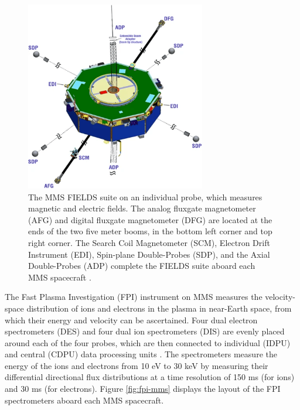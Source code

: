 \begin{figure}
    \centering
    \includegraphics[width=0.7\textwidth]{Figures/Instrumentation/Torbert_Figure7.png}
    \caption[MMS FIELDS suite]{The MMS FIELDS suite on an individual probe, which measures magnetic and electric fields. The analog fluxgate magnetometer (AFG) and digital fluxgate magnetometer (DFG) are located at the ends of the two five meter booms, in the bottom left corner and top right corner. The Search Coil Magnetometer (SCM),  Electron Drift Instrument (EDI), Spin-plane Double-Probes (SDP), and the Axial Double-Probes (ADP) complete the FIELDS suite aboard each MMS spacecraft \citep{Burch:2024}.}
    \label{fig:fgm-mms}
\end{figure}

The Fast Plasma Investigation (FPI) \citep{Pollock:2016} instrument on MMS measures the velocity-space distribution of ions and electrons in the plasma in near-Earth space, from which their energy and velocity can be ascertained. Four dual electron spectrometers (DES) and four dual ion spectrometers (DIS) are evenly placed around each of the four probes, which are then connected to individual (IDPU) and central (CDPU) data processing units \citep{Pollock:2016}. The spectrometers measure the energy of the ions and electrons from 10 eV to 30 keV by measuring their differential directional flux distributions at a time resolution of 150 ms (for ions) and 30 ms (for electrons). Figure \ref{fig:fpi-mms} displays the layout of the FPI spectrometers aboard each MMS spacecraft.


